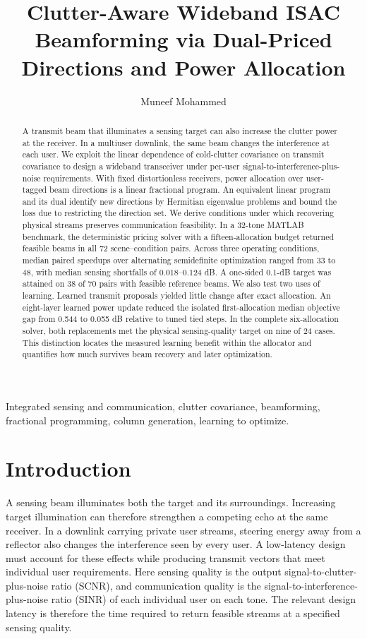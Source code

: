 \documentclass[journal]{IEEEtran}
\title{Clutter-Aware Wideband ISAC Beamforming via Dual-Priced Directions and Power Allocation}
\author{Muneef Mohammed}
\begin{document}
\maketitle
\setlength{\abovedisplayskip}{7pt plus 2pt minus 2pt}
\setlength{\belowdisplayskip}{7pt plus 2pt minus 2pt}
\setlength{\jot}{2pt}
\begin{abstract}
A transmit beam that illuminates a sensing target can also increase the clutter power at the receiver. In a multiuser downlink, the same beam changes the interference at each user. We exploit the linear dependence of cold-clutter covariance on transmit covariance to design a wideband transceiver under per-user signal-to-interference-plus-noise requirements. With fixed distortionless receivers, power allocation over user-tagged beam directions is a linear fractional program. An equivalent linear program and its dual identify new directions by Hermitian eigenvalue problems and bound the loss due to restricting the direction set. We derive conditions under which recovering physical streams preserves communication feasibility. In a 32-tone MATLAB benchmark, the deterministic pricing solver with a fifteen-allocation budget returned feasible beams in all 72 scene--condition pairs. Across three operating conditions, median paired speedups over alternating semidefinite optimization ranged from 33 to 48, with median sensing shortfalls of 0.018--0.124 dB. A one-sided 0.1-dB target was attained on 38 of 70 pairs with feasible reference beams. We also test two uses of learning. Learned transmit proposals yielded little change after exact allocation. An eight-layer learned power update reduced the isolated first-allocation median objective gap from 0.544 to 0.055 dB relative to tuned tied steps. In the complete six-allocation solver, both replacements met the physical sensing-quality target on nine of 24 cases. This distinction locates the measured learning benefit within the allocator and quantifies how much survives beam recovery and later optimization.
\end{abstract}
\begin{IEEEkeywords}
Integrated sensing and communication, clutter covariance, beamforming, fractional programming, column generation, learning to optimize.
\end{IEEEkeywords}

\section{Introduction}
A sensing beam illuminates both the target and its surroundings. Increasing target illumination can therefore strengthen a competing echo at the same receiver. In a downlink carrying private user streams, steering energy away from a reflector also changes the interference seen by every user. A low-latency design must account for these effects while producing transmit vectors that meet individual user requirements. Here sensing quality is the output signal-to-clutter-plus-noise ratio (SCNR), and communication quality is the signal-to-interference-plus-noise ratio (SINR) of each individual user on each tone. The relevant design latency is therefore the time required to return feasible streams at a specified sensing quality.
\end{document}
